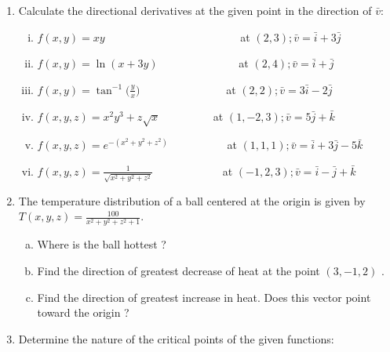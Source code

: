\documentclass[journal,12pt,twocolumn]{IEEEtran}
\begin{document}
\begin{enumerate}

\item Calculate the directional derivatives at the given point in the direction of  $\bar{v}$:

\begin{enumerate}[(i)]

\item $
f(x,y)=xy$  \ \ \ \ \ \ \ \ \ \ \ \ \ \ \ \ \ \ \ \ \ \ \ \  at $ (2,3) ; \bar{v}=\bar{i}+3\bar{j}
$

\item $
f(x,y)= \ln(x+3y)$ \ \ \ \ \ \ \ \ \ \ \ \ \ \ at $ (2,4) ; \bar{v}=\bar{i}+\bar{j}
$


\item $
f(x,y)= \tan^{-1} \big(\frac{y}{x}\big) $ \ \ \ \ \ \ \ \ \ \ \ \ \ \ \ at $ (2,2) ; \bar{v}=3\bar{i}-2\bar{j}
$


\item $
f(x,y,z)= x^2y^3+z\sqrt{x}  $ \ \ \ \ \ \ \ \ \  at $ (1,-2,3) ; \bar{v}=5\bar{j}+\bar{k}
$


\item $
f(x,y,z)= e^{-(x^2+y^2+z^2)} $ \ \ \ \ \ \ \ \ \ \ at $ (1,1,1) ; \bar{v}=\bar{i}+3\bar{j}-5\bar{k}
$


\item $
f(x,y,z)= \frac{1}{\sqrt{x^2+y^2+z^2}} $ \ \ \ \ \ \ \ \ \ \ \ \ at $ (-1,2,3) ; \bar{v}=\bar{i}-\bar{j}+\bar{k}
$


\end{enumerate}

\item The temperature distribution of a ball centered at the origin is given by $ T(x,y,z)=\frac{100}{x^2+y^2+z^2+1}$.

\begin{enumerate}[(a)]

\item Where is the ball hottest ?
\item Find the direction of greatest decrease of heat at the point $(3,-1,2)$ .
\item Find the direction of greatest increase in heat. Does this vector point toward the origin ?

\end{enumerate}


\item Determine the nature of the critical points of the given functions:

\begin{enumerate}[(i)]



\end{enumerate}
\end{enumerate}
\end{document}
